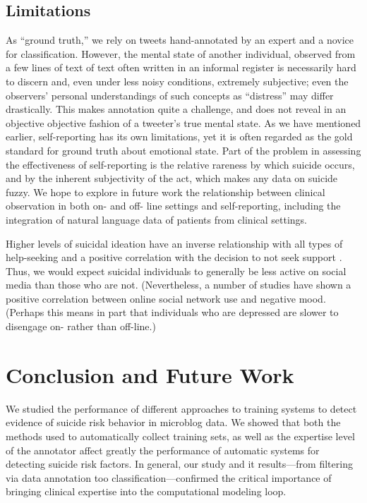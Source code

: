 \documentclass[11pt]{article}
\begin{document}
\subsection{Limitations}
As ``ground truth,'' we rely on tweets hand-annotated by an expert and a novice for classification. However, the mental state of another individual, observed from a few lines of text of text  often written in an informal register is necessarily hard to discern and, even under less noisy conditions, extremely subjective; even the observers' personal understandings of such concepts as ``distress'' may differ drastically. This makes annotation quite a challenge, and does not reveal in an objective objective fashion of a tweeter's true mental state. As we have mentioned earlier, self-reporting has its own limitations, yet it is often regarded as the gold standard for ground truth about emotional state.
Part of the problem in assessing the effectiveness of self-reporting is the relative rareness by which suicide occurs, and by the inherent subjectivity of the act, which makes any data on suicide fuzzy. We hope to explore in future work the relationship between clinical observation in both on- and off- line settings and self-reporting, including the integration of natural language data of patients from clinical settings.


Higher levels of suicidal ideation have an inverse relationship with all types of help-seeking and a positive correlation with the decision to not seek support \cite{deane2001suicidal}. Thus, we would expect suicidal individuals to generally be less active on social media than those who are not. (Nevertheless, a number of studies have shown a positive correlation between online social network use and negative mood. (Perhaps this means in part that individuals who are depressed are slower to disengage on- rather than off-line.)
 



 
\section{Conclusion and Future Work}
We studied the performance of different approaches to training systems to detect evidence of suicide risk behavior in microblog data. We showed that both the methods used to automatically collect training sets, as well as the expertise level of the annotator affect greatly the performance of automatic systems for detecting suicide risk factors. In general, our study and it results---from filtering via data annotation too classification---confirmed the critical importance of bringing clinical expertise into the computational modeling loop. 
\end{document}
